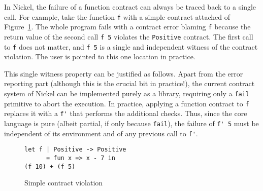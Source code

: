 \documentclass[sigplan,10pt,review,anonymous]{acmart}
\newcommand{\nickel}[1]{\lstinline[language=nickel]{#1}}
\begin{document}
In Nickel, the failure of a function contract can always be traced back to a
single call. For example, take the function \nickel{f} with a simple contract
attached of Figure~\ref{fig:pos-to-pos}. The whole program fails with a contract
error blaming \nickel{f} because the return value of the second call \nickel{f 5}
violates the \nickel{Positive} contract. The first call to \nickel{f} does
not matter, and \nickel{f 5} is a single and independent witness of the contract
violation. The user is pointed to this one location in practice.

This single witness property can be justified as follows. Apart from the error
reporting part (although this is the crucial bit in practice!), the current
contract system of Nickel can be implemented purely as a library, requiring only
a \nickel{fail} primitive to abort the execution. In practice, applying a
function contract to \nickel{f} replaces it with a \nickel{f'} that performs the
additional checks. Thus, since the core language is pure (albeit
partial, if only because \nickel{fail}), the failure of \nickel{f' 5}
must be independent of its environment and of any previous call to \nickel{f'}.

%

\begin{figure}[h]
\begin{lstlisting}[language=nickel]
let f | Positive -> Positive
      = fun x => x - 7 in
(f 10) + (f 5)
\end{lstlisting}
\caption{Simple contract violation}
\label{fig:pos-to-pos}
\end{figure}

%
\end{document}
